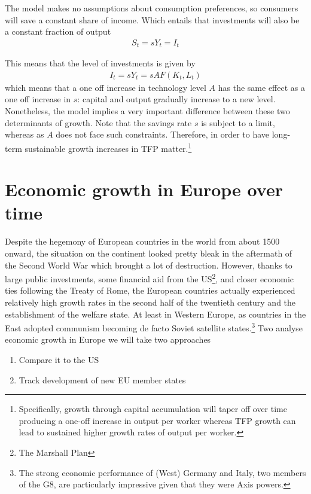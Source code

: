 \documentclass{tufte-handout}
\begin{document}
The model makes no assumptions about consumption preferences, so consumers will save a constant share of income. 
Which entails that investments will also be a constant fraction of output
\begin{align*}
  S_t = sY_t = I_t
\end{align*}

This means that the level of investments is given by
\begin{align*}
  I_t=sY_t=sAF(K_t,L_t)
\end{align*}
which means that a one off increase in technology level $A$ has the same effect as a one off increase in $s$: capital and output gradually increase to a new level.
Nonetheless, the model implies a very important difference between these two determinants of growth.
Note that the savings rate $s$ is subject to a limit, whereas as $A$ does not face such constraints. 
Therefore, in order to have long-term sustainable growth increases in TFP matter.\footnote{Specifically, growth through capital accumulation will taper off over time producing a one-off increase in output per worker whereas TFP growth can lead to sustained higher growth rates of output per worker.} 

\section{Economic growth in Europe over time}
Despite the hegemony of European countries in the world from about 1500 onward, the situation on the continent looked pretty bleak in the aftermath of the Second World War which brought a lot of destruction. 
However, thanks to large public investments, some financial aid from the US\footnote{The Marshall Plan}, and closer economic ties following the Treaty of Rome, the European countries actually experienced relatively high growth rates in the second half of the twentieth century and the establishment of the welfare state. 
At least in Western Europe, as countries in the East adopted communism becoming de facto Soviet satellite states.\footnote{The strong economic performance of (West) Germany and Italy, two members of the G8, are particularly impressive given that they were Axis powers.}
Two analyse economic growth in Europe we will take two approaches
\begin{enumerate}
  \item Compare it to the US
  \item Track development of new EU member states
\end{enumerate}
\end{document}
